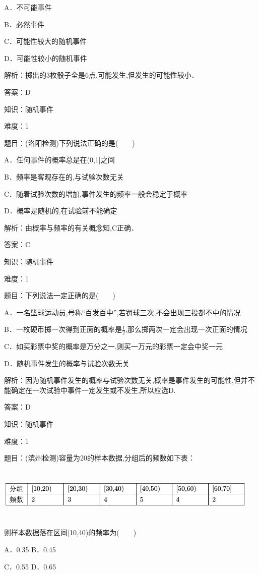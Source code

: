 \documentclass{article} %
\begin{document}
A．不可能事件

B．必然事件

C．可能性较大的随机事件

D．可能性较小的随机事件

解析：掷出的3枚骰子全是6点,可能发生,但发生的可能性较小．

答案：D

知识：随机事件

难度：1

题目：(洛阳检测)下列说法正确的是(　　)

A．任何事件的概率总是在(0,1]之间

B．频率是客观存在的,与试验次数无关

C．随着试验次数的增加,事件发生的频率一般会稳定于概率

D．概率是随机的,在试验前不能确定

解析：由概率与频率的有关概念知,C正确． 

答案：C

知识：随机事件

难度：1

题目：下列说法一定正确的是(　　)

A．一名篮球运动员,号称``百发百中'',若罚球三次,不会出现三投都不中的情况

B．一枚硬币掷一次得到正面的概率是$\frac{1}{2}$,那么掷两次一定会出现一次正面的情况

C．如买彩票中奖的概率是万分之一,则买一万元的彩票一定会中奖一元

D．随机事件发生的概率与试验次数无关

解析：因为随机事件发生的概率与试验次数无关,概率是事件发生的可能性,但并不能确定在一次试验中事件一定发生或不发生,所以应选D.

答案：D

知识：随机事件

难度：1

题目：(滨州检测)容量为20的样本数据,分组后的频数如下表：

\includegraphics*[width=5in, height=1in, keepaspectratio=false]{image122}

则样本数据落在区间[10,40)的频率为(　　)

A．0.35  B．0.45

C．0.55  D．0.65
\end{document}
